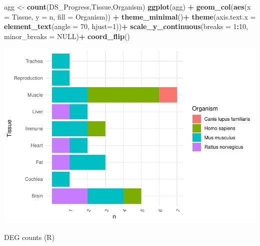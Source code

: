 \documentclass[
]{article}
\newenvironment{Shaded}{\begin{snugshade}}{\end{snugshade}}
\newcommand{\DataTypeTok}[1]{\textcolor[rgb]{0.13,0.29,0.53}{#1}}
\newcommand{\DecValTok}[1]{\textcolor[rgb]{0.00,0.00,0.81}{#1}}
\newcommand{\KeywordTok}[1]{\textcolor[rgb]{0.13,0.29,0.53}{\textbf{#1}}}
\newcommand{\NormalTok}[1]{#1}
\newcommand{\OperatorTok}[1]{\textcolor[rgb]{0.81,0.36,0.00}{\textbf{#1}}}
\newcommand{\OtherTok}[1]{\textcolor[rgb]{0.56,0.35,0.01}{#1}}
\newcommand{\StringTok}[1]{\textcolor[rgb]{0.31,0.60,0.02}{#1}}
\begin{document}
\begin{Shaded}
\begin{Highlighting}[]
\NormalTok{agg <-}\StringTok{ }\KeywordTok{count}\NormalTok{(DS_Progress,Tissue,Organism)}
\KeywordTok{ggplot}\NormalTok{(agg) }\OperatorTok{+}
\StringTok{  }\KeywordTok{geom_col}\NormalTok{(}\KeywordTok{aes}\NormalTok{(}\DataTypeTok{x =}\NormalTok{ Tissue, }\DataTypeTok{y =}\NormalTok{ n, }\DataTypeTok{fill =}\NormalTok{ Organism)) }\OperatorTok{+}
\StringTok{  }\KeywordTok{theme_minimal}\NormalTok{()}\OperatorTok{+}
\StringTok{  }\KeywordTok{theme}\NormalTok{(}\DataTypeTok{axis.text.x =} \KeywordTok{element_text}\NormalTok{(}\DataTypeTok{angle =} \DecValTok{70}\NormalTok{, }\DataTypeTok{hjust=}\DecValTok{1}\NormalTok{))}\OperatorTok{+}
\StringTok{  }\KeywordTok{scale_y_continuous}\NormalTok{(}\DataTypeTok{breaks =} \DecValTok{1}\OperatorTok{:}\DecValTok{10}\NormalTok{, }\DataTypeTok{minor_breaks =} \OtherTok{NULL}\NormalTok{)}\OperatorTok{+}
\StringTok{  }\KeywordTok{coord_flip}\NormalTok{()}
\end{Highlighting}
\end{Shaded}

\includegraphics{Thesis_DualCodeTest_files/figure-latex/unnamed-chunk-39-1.pdf}

DEG counts (R)

\begin{Shaded}
\end{Shaded}
\end{document}
